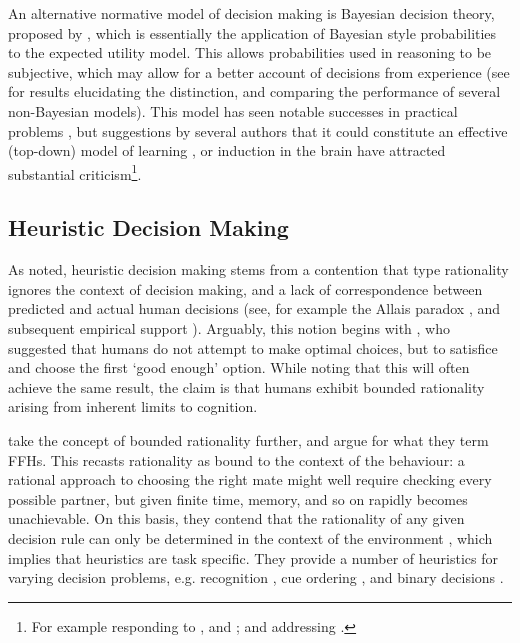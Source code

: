 An alternative normative model of decision making is Bayesian decision theory, proposed by \citet{Robbins1964}, which is essentially the application of Bayesian style probabilities to the expected utility model. This allows probabilities used in reasoning to be subjective, which may allow for a better account of decisions from experience (see \citet{Hertwig2004,Hau2008} for results elucidating the distinction, and comparing the performance of several non-Bayesian models). This model has seen notable successes in practical problems \citep{McNamara1980,Kristensen1997,Survey2003}, but suggestions by several authors  that it could constitute an effective (top-down) model of learning \citep{Tenenbaum2006,Griffiths2010}, or induction \citep{Gallistel2012} in the brain have attracted substantial criticism\footnote{For example \citet{Bowers2012} responding to \citet{Tenenbaum2006}, and \citet{Griffiths2010}; and \citet{Miller2012} addressing \citet{Gallistel2012}.}.

\subsection{Heuristic Decision Making}\label{sub:heuristic_theories}

As noted, heuristic decision making stems from a contention that \citeauthor{Neumann1953} type rationality ignores the context of decision making, and a lack of correspondence between predicted and actual human decisions (see, for example the Allais paradox \citep{Society2013}, and subsequent empirical support \citep{Burke1996,Oliver2003}). Arguably, this notion begins with \citet{Simon1956}, who suggested that humans do not attempt to make optimal choices, but to satisfice and choose the first `good enough' option. While noting that this will often achieve the same result, the claim is that humans exhibit bounded rationality \citep{Simon2000} arising from inherent limits to cognition.

\citet{Gigerenzer1996} take the concept of bounded rationality further, and argue for what they term \acp{FFH}. This recasts rationality as bound to the context of the behaviour: a rational approach to choosing the right mate might well require checking every possible partner, but given finite time, memory, and so on rapidly becomes unachievable. On this basis, they contend that the rationality of any given decision rule can only be determined in the context of the environment \citep{Todd2003}, which implies that heuristics are task specific. They provide a number of heuristics for varying decision problems, e.g. recognition \citep{Goldstein2002}, cue ordering \citep{Gigerenzer1999,Todd2004}, and binary decisions \citep{Brandstatter2006}.

